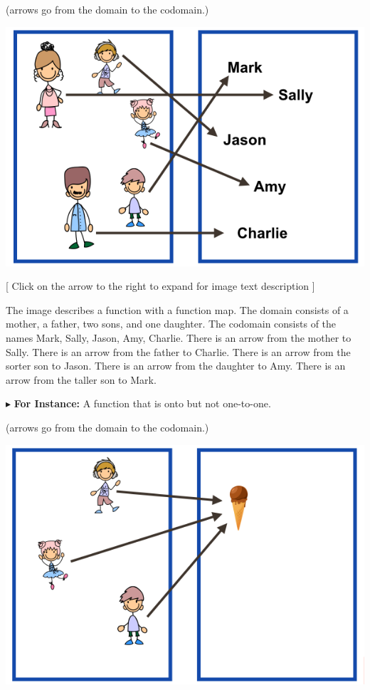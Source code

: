 \documentclass{ximera}
\begin{document}
\begin{center}
(arrows go from the domain to the codomain.)
\begin{image}
\includegraphics{pics/ontoandonetoone.png}
\end{image}
[ Click on the arrow to the right to expand for image text description ]
\begin{expandable} 
The image describes a function with a function map. The domain consists of a mother, a father, two sons, and one daughter. The codomain consists of the names Mark, Sally, Jason, Amy, Charlie. There is an arrow from the mother to Sally. There is an arrow from the father to Charlie. There is an arrow from the sorter son to Jason. There is an arrow from the daughter to Amy. There is an arrow from the taller son to Mark.
\end{expandable}
\end{center}






$\blacktriangleright$ \textbf{For Instance:} A function that is onto but not one-to-one.  \\

\begin{center}
(arrows go from the domain to the codomain.)
\begin{image}
\includegraphics{pics/onto.png}
\end{image}
\end{center}
\end{document}

